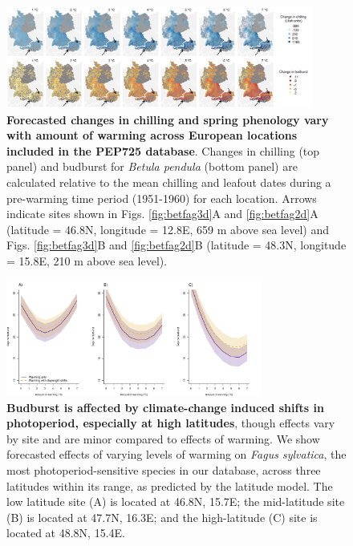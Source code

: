 \documentclass{article}
\begin{document}
\begin{figure}[h!]
\centering
\noindent \includegraphics[width=0.90\textwidth]{..//..//analyses/bb_analysis/figures/forecasting/EDFig6_heatmapsbetpepfinalarrows.png}
\caption{\textbf{Forecasted changes in chilling and spring phenology vary with amount of warming across European locations included in the PEP725 database}. Changes in chilling (top panel) and budburst for \emph{Betula pendula} (bottom panel) are calculated relative to the mean chilling and leafout dates during a pre-warming time period (1951-1960) for each location. Arrows indicate sites shown in Figs. \ref{fig:betfag3d}A and \ref{fig:betfag2d}A (latitude = 46.8\degree N, longitude =  12.8\degree E, 659 m above sea level) and Figs. \ref{fig:betfag3d}B and \ref{fig:betfag2d}B (latitude = 48.3\degree N, longitude =  15.8\degree E, 210 m above sea level).} 
\label{fig:foremap}
\end{figure}

\begin{figure}[h!]
\centering
\noindent \includegraphics[width=0.75\textwidth]{..//..//analyses/bb_analysis/figures/forecasting/EDFig7_fagsyl_3lats.pdf}
\caption{\textbf{Budburst is affected by climate-change induced shifts in photoperiod, especially at high latitudes}, though effects vary by site and are minor compared to effects of warming. We show forecasted effects of varying levels of warming on \emph{Fagus sylvatica}, the most photoperiod-sensitive species in our database, across three latitudes within its range, as predicted by the latitude model. The low latitude site (A) is  located at 46.8\degree N, 15.7\degree E; the mid-latitude site (B) is located at 47.7\degree N, 16.3\degree E; and the high-latitude (C) site is located at 48.8\degree N, 15.4\degree E.}
\label{fig:fagsyllat}
\end{figure}
\end{document}
